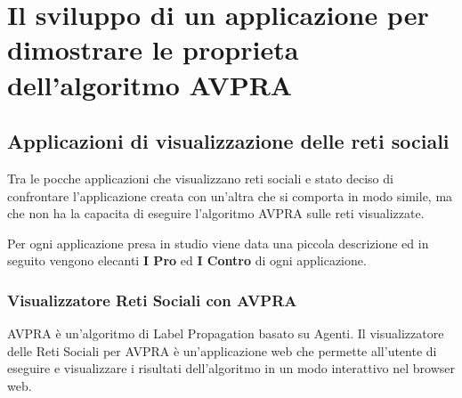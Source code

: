 \documentclass[a4paper,12pt]{report}
\begin{document}
\chapter[Il sviluppo dell'applicazione]{Il sviluppo di un applicazione per dimostrare le proprieta dell'algoritmo AVPRA}

	\section{Applicazioni di visualizzazione delle reti sociali}
		Tra le pocche applicazioni che visualizzano reti sociali e stato deciso di confrontare l'applicazione creata con un'altra che si comporta in modo simile, ma che non ha la capacita di eseguire l'algoritmo AVPRA sulle reti visualizzate.

		Per ogni applicazione presa in studio viene data una piccola descrizione ed in seguito vengono elecanti \textbf{I Pro} ed \textbf{I Contro} di ogni applicazione.

		\subsection{Visualizzatore Reti Sociali con AVPRA}
		AVPRA è un'algoritmo di Label Propagation basato su Agenti.
		Il visualizzatore delle Reti Sociali per AVPRA è un'applicazione web che permette all'utente di
		eseguire e visualizzare i risultati dell'algoritmo in un modo interattivo nel browser web.
		
\end{document}
